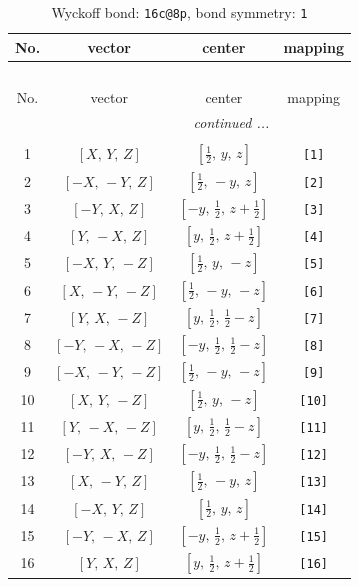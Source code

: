 \documentclass[fleqn,8pt]{jsarticle}
\begin{document}
\begin{longtable}{cccc}
\caption{Wyckoff bond: {\tt 16c@8p}, bond symmetry: {\tt 1}}
 \\
 \hline \hline
No. & vector & center & mapping \\ \hline \endfirsthead

\multicolumn{3}{l}{\tablename\ \thetable{}} \\
 \hline \hline
No. & vector & center & mapping \\ \hline \endhead

 \hline \hline
\multicolumn{3}{r}{\footnotesize\it continued ...} \\ \endfoot

 \hline \hline
\multicolumn{3}{r}{} \\ \endlastfoot

1 & $\left[ X,\, Y,\, Z \right]$ & $\left[ \frac{1}{2},\, y,\, z \right]$ & {\tt [1]} \\ \hline
2 & $\left[ - X,\, - Y,\, Z \right]$ & $\left[ \frac{1}{2},\, - y,\, z \right]$ & {\tt [2]} \\ \hline
3 & $\left[ - Y,\, X,\, Z \right]$ & $\left[ - y,\, \frac{1}{2},\, z + \frac{1}{2} \right]$ & {\tt [3]} \\ \hline
4 & $\left[ Y,\, - X,\, Z \right]$ & $\left[ y,\, \frac{1}{2},\, z + \frac{1}{2} \right]$ & {\tt [4]} \\ \hline
5 & $\left[ - X,\, Y,\, - Z \right]$ & $\left[ \frac{1}{2},\, y,\, - z \right]$ & {\tt [5]} \\ \hline
6 & $\left[ X,\, - Y,\, - Z \right]$ & $\left[ \frac{1}{2},\, - y,\, - z \right]$ & {\tt [6]} \\ \hline
7 & $\left[ Y,\, X,\, - Z \right]$ & $\left[ y,\, \frac{1}{2},\, \frac{1}{2} - z \right]$ & {\tt [7]} \\ \hline
8 & $\left[ - Y,\, - X,\, - Z \right]$ & $\left[ - y,\, \frac{1}{2},\, \frac{1}{2} - z \right]$ & {\tt [8]} \\ \hline
9 & $\left[ - X,\, - Y,\, - Z \right]$ & $\left[ \frac{1}{2},\, - y,\, - z \right]$ & {\tt [9]} \\ \hline
10 & $\left[ X,\, Y,\, - Z \right]$ & $\left[ \frac{1}{2},\, y,\, - z \right]$ & {\tt [10]} \\ \hline
11 & $\left[ Y,\, - X,\, - Z \right]$ & $\left[ y,\, \frac{1}{2},\, \frac{1}{2} - z \right]$ & {\tt [11]} \\ \hline
12 & $\left[ - Y,\, X,\, - Z \right]$ & $\left[ - y,\, \frac{1}{2},\, \frac{1}{2} - z \right]$ & {\tt [12]} \\ \hline
13 & $\left[ X,\, - Y,\, Z \right]$ & $\left[ \frac{1}{2},\, - y,\, z \right]$ & {\tt [13]} \\ \hline
14 & $\left[ - X,\, Y,\, Z \right]$ & $\left[ \frac{1}{2},\, y,\, z \right]$ & {\tt [14]} \\ \hline
15 & $\left[ - Y,\, - X,\, Z \right]$ & $\left[ - y,\, \frac{1}{2},\, z + \frac{1}{2} \right]$ & {\tt [15]} \\ \hline
16 & $\left[ Y,\, X,\, Z \right]$ & $\left[ y,\, \frac{1}{2},\, z + \frac{1}{2} \right]$ & {\tt [16]} \\
\end{longtable}
\end{document}

